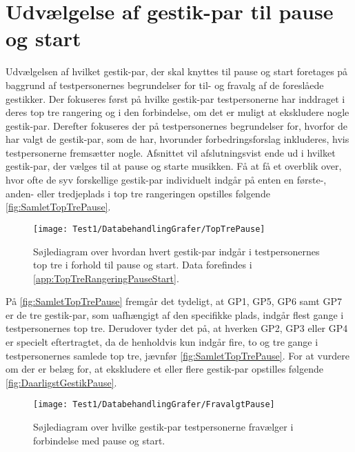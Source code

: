 \section{Udvælgelse af gestik-par til pause og start}
\label{TestresultaterPauseStart}
%
Udvælgelsen af hvilket gestik-par, der skal knyttes til pause og start foretages på baggrund af testpersonernes begrundelser for til- og fravalg af de foreslåede gestikker. Der fokuseres først på hvilke gestik-par testpersonerne har inddraget i deres top tre rangering og i den forbindelse, om det er muligt at ekskludere nogle gestik-par. Derefter fokuseres der på testpersonernes begrundelser for, hvorfor de har valgt de gestik-par, som de har, hvorunder forbedringsforslag inkluderes, hvis testpersonerne fremsætter nogle. Afsnittet vil afslutningsvist ende ud i hvilket gestik-par, der vælges til at pause og starte musikken.\blankline
%
Få at få et overblik over, hvor ofte de syv forskellige gestik-par individuelt indgår på enten en første-, anden- eller tredjeplads i top tre rangeringen opstilles følgende \autoref{fig:SamletTopTrePause}. 
%
\begin{figure}[H]
	\centering
	\texttt{[image: Test1/DatabehandlingGrafer/TopTrePause]}
	\caption{Søjlediagram over hvordan hvert gestik-par indgår i testpersonernes top tre i forhold til pause og start. Data forefindes i \autoref{app:TopTreRangeringPauseStart}.}
	\label{fig:SamletTopTrePause}
\end{figure}
\noindent
% 
På \autoref{fig:SamletTopTrePause} fremgår det tydeligt, at GP1, GP5, GP6 samt GP7 er de tre gestik-par, som uafhængigt af den specifikke plads, indgår flest gange i testpersonernes top tre. Derudover tyder det på, at hverken GP2, GP3 eller GP4 er specielt eftertragtet, da de henholdvis kun indgår fire, to og tre gange i testpersonernes samlede top tre, jævnfør \autoref{fig:SamletTopTrePause}. For at vurdere om der er belæg for, at ekskludere et eller flere gestik-par opstilles følgende \autoref{fig:DaarligstGestikPause}.  
%
\begin{figure}[H]
	\centering
	\texttt{[image: Test1/DatabehandlingGrafer/FravalgtPause]}
	\caption{Søjlediagram over hvilke gestik-par testpersonerne fravælger i forbindelse med pause og start.}
	\label{fig:DaarligstGestikPause}
\end{figure}
\noindent
%
